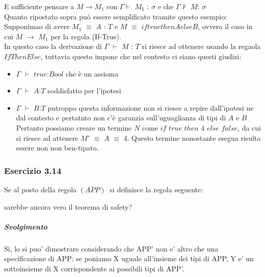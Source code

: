 E sufficiente pensare a $M \rightarrow M_1$ con $\Gamma\vdash$ $M_1$ : $\sigma$ e che 
$\Gamma\nvdash$ $M$: $\sigma$\\
Quanto ripostato sopra pu\`o essere semplificato tramite questo esempio:\\
Supponimao di avere $M_1$ $\equiv$ $A$ : $T$ e $M$ $\equiv$ $if true then A else B$, ovvero il caso in cui $M$ $\rightarrow$ $M_1$ per la regola (If-True).\\
In questo caso la derivazione di $\Gamma$ $\vdash$ $M$ : $T$ ri riesce ad ottenere usando la regaola $IfThenElse$, tuttavia questo impone che nel contesto ci siano questi giudizi:
\begin{itemize}
\item $\Gamma$ $\vdash$ $true$:$Bool$ che \`e un assioma
\item $\Gamma$ $\vdash$ $A$:$T$ soddisfatto per l'ipotesi 
\item  $\Gamma$ $\vdash$ $B$:$T$ putroppo questa informazione non si riesce a repire dall'ipotesi ne dal contesto e pertatnto non c'\`e garanzia sull'uguaglianza di tipi di $A$ e $B$\\
Pertanto possiamo creare un termine $N$ come $if$ $true$ $then$ $4$ $else$ $false$, da cui si riesce ad attenere $M'$ $\equiv$ $A$ $\equiv$ $4$. Questo termine nonostante esegua risulta essere non non ben-tipato.


\end{itemize}







\subsubsection*{Esercizio 3.14}
Se al posto della regola $(APP)\:$ si definisce la regola seguente:

\begin{prooftree} 
	
\end{prooftree} 

sarebbe ancora vero il teorema di safety?
\subparagraph*{Svolgimento}
Si, lo si puo' dimostrare considerando che APP' non e' altro che una specificazione di APP: se poniamo X uguale all'insieme dei tipi di APP, Y e' un sottoinsieme di X corrispondente ai possibili tipi di APP'.

